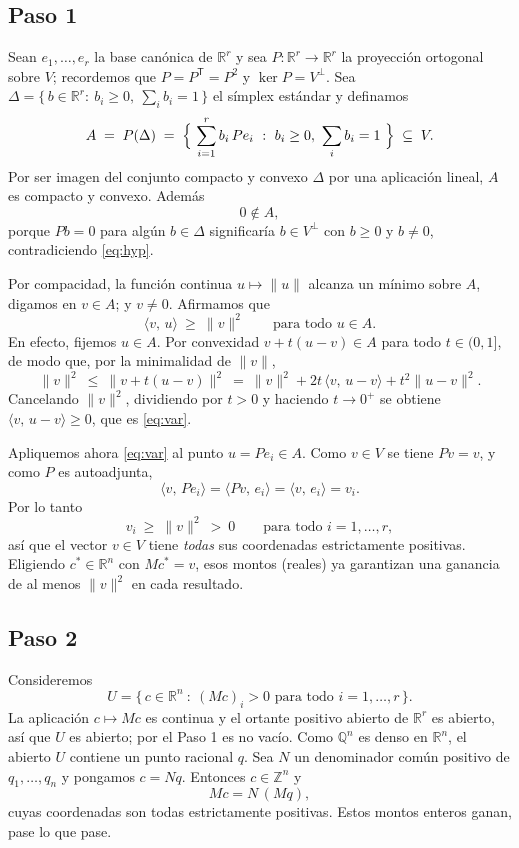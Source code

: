 \documentclass[11pt]{amsproc}
\newcommand{\R}{\mathbb{R}}
\newcommand{\Z}{\mathbb{Z}}
\newcommand{\Q}{\mathbb{Q}}
\newcommand{\ip}[2]{\langle #1,\, #2\rangle}
\begin{document}
\subsection*{Paso 1}

Sean $e_1,\dots,e_r$ la base canónica de $\R^r$ y sea $P\colon\R^r\to\R^r$ la
proyección ortogonal sobre $V$; recordemos que $P=P^{\mathsf T}=P^2$ y
$\ker P=V^{\perp}$. Sea $\Delta=\{\,b\in\R^r:\ b_i\ge 0,\ \sum_i b_i=1\,\}$ el
símplex estándar y definamos
\[
  A \;=\; P(\Delta) \;=\; \Bigl\{\ \sum_{i=1}^{r} b_i\,Pe_i \ :\ b_i\ge 0,\ \sum_i b_i=1 \ \Bigr\}
  \;\subseteq\; V .
\]
Por ser imagen del conjunto compacto y convexo $\Delta$ por una aplicación lineal,
$A$ es compacto y convexo. Además
\[
  0\notin A,
\]
porque $Pb=0$ para algún $b\in\Delta$ significaría $b\in V^{\perp}$ con $b\ge 0$ y
$b\neq 0$, contradiciendo \eqref{eq:hyp}.

Por compacidad, la función continua $u\mapsto\|u\|$ alcanza un mínimo sobre $A$,
digamos en $v\in A$; y $v\neq 0$. Afirmamos que
\begin{equation}\label{eq:var}
  \ip{v}{u}\ \ge\ \|v\|^{2}\qquad\text{para todo } u\in A .
\end{equation}
En efecto, fijemos $u\in A$. Por convexidad $v+t(u-v)\in A$ para todo $t\in(0,1]$, de
modo que, por la minimalidad de $\|v\|$,
\[
  \|v\|^{2}\ \le\ \|v+t(u-v)\|^{2}
  \ =\ \|v\|^{2}+2t\,\ip{v}{u-v}+t^{2}\|u-v\|^{2}.
\]
Cancelando $\|v\|^2$, dividiendo por $t>0$ y haciendo $t\to 0^{+}$ se obtiene
$\ip{v}{u-v}\ge 0$, que es \eqref{eq:var}.

Apliquemos ahora \eqref{eq:var} al punto $u=Pe_i\in A$. Como $v\in V$ se tiene
$Pv=v$, y como $P$ es autoadjunta,
\[
  \ip{v}{Pe_i}=\ip{Pv}{e_i}=\ip{v}{e_i}=v_i .
\]
Por lo tanto
\[
  v_i\ \ge\ \|v\|^{2}\ >\ 0\qquad\text{para todo } i=1,\dots,r,
\]
así que el vector $v\in V$ tiene \emph{todas} sus coordenadas estrictamente
positivas. Eligiendo $c^{\ast}\in\R^n$ con $Mc^{\ast}=v$, esos montos (reales) ya
garantizan una ganancia de al menos $\|v\|^2$ en cada resultado.

\subsection*{Paso 2} 

Consideremos
\[
  U=\{\,c\in\R^{n}\ :\ (Mc)_i>0 \text{ para todo } i=1,\dots,r\,\}.
\]
La aplicación $c\mapsto Mc$ es continua y el ortante positivo abierto de $\R^r$ es
abierto, así que $U$ es abierto; por el Paso 1 es no vacío. Como $\Q^{n}$ es denso en
$\R^{n}$, el abierto $U$ contiene un punto racional $q$. Sea $N$ un denominador común
positivo de $q_1,\dots,q_n$ y pongamos $c=Nq$. Entonces $c\in\Z^{n}$ y
\[
  Mc = N\,(Mq),
\]
cuyas coordenadas son todas estrictamente positivas. Estos montos enteros ganan,
pase lo que pase. 
\end{document}

